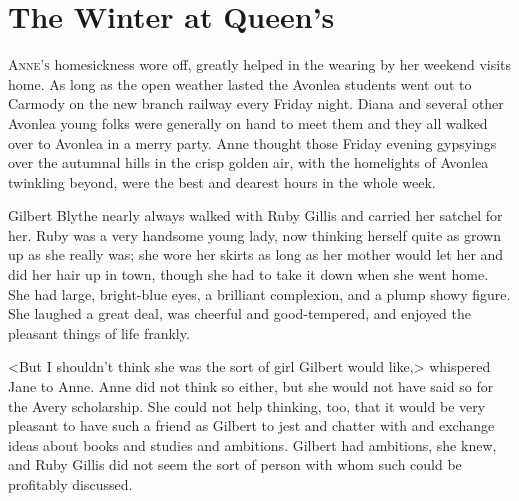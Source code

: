 \chapter{The Winter at Queen's}

\lettrine{A}{nne's} homesickness wore off, greatly helped in the wearing by her weekend visits home. As long as the open weather lasted the Avonlea students went out to Carmody on the new branch railway every Friday night. Diana and several other Avonlea young folks were generally on hand to meet them and they all walked over to Avonlea in a merry party. Anne thought those Friday evening gypsyings over the autumnal hills in the crisp golden air, with the homelights of Avonlea twinkling beyond, were the best and dearest hours in the whole week.

Gilbert Blythe nearly always walked with Ruby Gillis and carried her satchel for her. Ruby was a very handsome young lady, now thinking herself quite as grown up as she really was; she wore her skirts as long as her mother would let her and did her hair up in town, though she had to take it down when she went home. She had large, bright-blue eyes, a brilliant complexion, and a plump showy figure. She laughed a great deal, was cheerful and good-tempered, and enjoyed the pleasant things of life frankly.

<But I shouldn't think she was the sort of girl Gilbert would like,> whispered Jane to Anne. Anne did not think so either, but she would not have said so for the Avery scholarship. She could not help thinking, too, that it would be very pleasant to have such a friend as Gilbert to jest and chatter with and exchange ideas about books and studies and ambitions. Gilbert had ambitions, she knew, and Ruby Gillis did not seem the sort of person with whom such could be profitably discussed.

